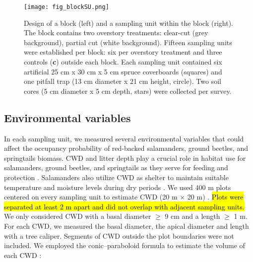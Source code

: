 \pagebreak

\begin{figure}[ht]
	\centering
	\texttt{[image: fig\_blockSU.png]}
	\caption[Design of one block and one sampling unit with three sampling methods.]{
  Design of a block (left) and a sampling unit within the block (right). 
  The block contains two overstory treatments: clear-cut (grey background), partial cut (white background). 
  Fifteen sampling units were established per block: six per overstory treatment and three controls (\textbf{c}) outside each block.
  Each sampling unit contained six artificial 25 cm x 30 cm x 5 cm spruce coverboards (squares) and one pitfall trap (13 cm diameter x 21 cm height, circle). 
  Two soil cores (5 cm diameter x 5 cm depth, stars) were collected per survey.
  }
	\label{fig:blockSU}
	\end{figure}  

\vspace{0.5cm}


\subsection*{Environmental variables}
\label{subsec:Envar}

In each sampling unit, we measured several environmental variables that could affect the occupancy probability of red-backed salamanders, ground beetles, and springtails biomass.
CWD and litter depth play a crucial role in habitat use for salamanders, ground beetles, and springtails as
they serve for feeding and protection \citep{harmonEcologyCoarseWoody1986,koivula.LeafLitterSmallscale1999,birdChangesSoilLitter2004,McKenny2006Effectsstructural}. 
Salamanders also utilize CWD as shelter to maintain suitable temperature and moisture levels during dry periods \citep{Jaeger1980MicrohabitatsTerrestrial,groverInfluenceCoverMoisture1998a,patrickEffectsExperimentalForestry2006a}. 
We used 400 m plots centered on every sampling unit to estimate CWD (20 m $\times$  20 m) \citep{methotGuideInventaireEchantillonnage2014}. 
\hl{Plots were separated at least 2 m apart and did not overlap with adjacent sampling units. }
We only considered CWD with a basal diameter $\geq$ 9 cm and a length $\geq$ 1 m. 
For each CWD, we measured the basal diameter, the apical diameter and length with a tree caliper. 
Segments of CWD outside the plot boundaries were not included. 
We employed the conic–paraboloid formula to estimate the volume of each CWD \citep{fraverRefiningVolumeEstimates2007} :

